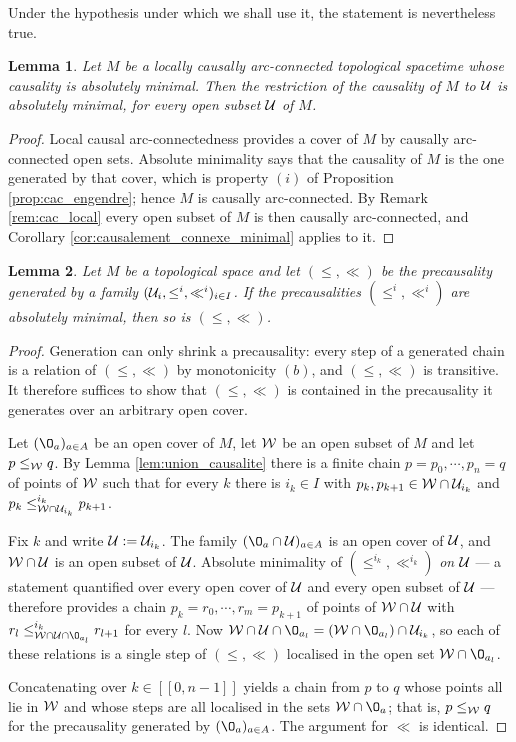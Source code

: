 \documentclass[a4paper,twoside]{article}
\providecommand{\lsem}{[\![}
\providecommand{\rsem}{]\!]}
\newtheorem{lem}{Lemma}[section]
\begin{document}
Under the hypothesis under which we shall use it, the statement is nevertheless true.

\begin{lem}\label{lem:precausalite_restriction_minimale} Let $M$ be a locally causally arc-connected topological spacetime whose causality is absolutely minimal. Then the restriction of the causality of $M$ to $\mathcal{U}$ is absolutely minimal, for every open subset $\mathcal{U}$ of $M$.
\end{lem}
\begin{proof}
Local causal arc-connectedness provides a cover of $M$ by causally arc-connected open sets. Absolute minimality says that the causality of $M$ is the one generated by that cover, which is property $(i)$ of Proposition \ref{prop:cac_engendre}; hence $M$ is causally arc-connected. By Remark \ref{rem:cac_local} every open subset of $M$ is then causally arc-connected, and Corollary \ref{cor:causalement_connexe_minimal} applies to it.
\end{proof}

\begin{lem}\label{lem:precausalite_engendre_minimale}
Let $M$ be a topological space and let $(\leq,\ll)$ be the precausality generated by a family $(\mathcal{U}_i,\leq^i,\ll^i)_{i\in I}$.
If the precausalities $(\leq^i,\ll^i)$ are absolutely minimal, then so is $(\leq,\ll)$.
\end{lem}
\begin{proof}
Generation can only shrink a precausality: every step of a generated chain is a relation of $(\leq,\ll)$ by monotonicity $(b)$, and $(\leq,\ll)$ is transitive. It therefore suffices to show that $(\leq,\ll)$ is contained in the precausality it generates over an arbitrary open cover.

Let $(\O_a)_{a\in A}$ be an open cover of $M$, let $\mathcal W$ be an open subset of $M$ and let $p\leq_\mathcal W q$. By Lemma \ref{lem:union_causalite} there is a finite chain $p=p_0,\cdots,p_n=q$ of points of $\mathcal W$ such that for every $k$ there is $i_k\in I$ with $p_k,p_{k+1}\in \mathcal W\cap \mathcal{U}_{i_k}$ and $p_k\leq^{i_k}_{\mathcal W\cap \mathcal{U}_{i_k}} p_{k+1}$.

Fix $k$ and write $\mathcal{U}:=\mathcal{U}_{i_k}$. The family $(\O_a\cap \U)_{a\in A}$ is an open cover of $\mathcal{U}$, and $\mathcal W\cap \mathcal{U}$ is an open subset of $\mathcal{U}$. Absolute minimality of $(\leq^{i_k},\ll^{i_k})$ \emph{on $\mathcal{U}$} --- a statement quantified over every open cover of $\mathcal{U}$ and every open subset of $\mathcal{U}$ --- therefore provides a chain $p_k=r_0,\cdots,r_m=p_{k+1}$ of points of $\mathcal W\cap \mathcal{U}$ with $r_l\leq^{i_k}_{\W\cap \U\cap \O_{a_l}} r_{l+1}$ for every $l$. Now $\W\cap \U\cap \O_{a_l}=(\W\cap \O_{a_l})\cap \U_{i_k}$, so each of these relations is a single step of $(\leq,\ll)$ localised in the open set $\W\cap \O_{a_l}$.

Concatenating over $k\in\lsem 0,n-1\rsem$ yields a chain from $p$ to $q$ whose points all lie in $\mathcal W$ and whose steps are all localised in the sets $\W\cap \O_a$; that is, $p\leq_\mathcal W q$ for the precausality generated by $(\O_a)_{a\in A}$. The argument for $\ll$ is identical.
\end{proof}
\end{document}
